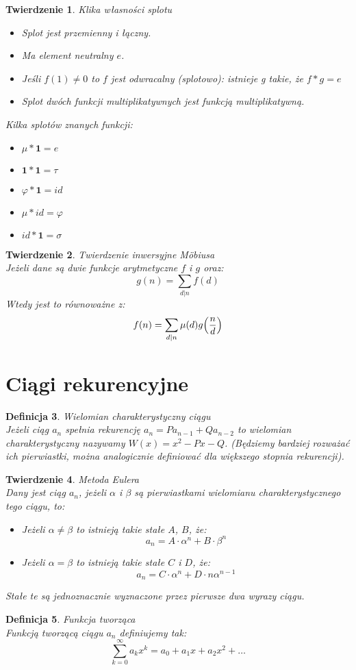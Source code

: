 \documentclass[10pt,a4paper]{article}
\newtheorem{theorem}{Twierdzenie}[section]
\newtheorem{defi}[theorem]{Definicja}
\newcommand{\q}{\textbf{1}}
\begin{document}
\begin{theorem}{Klika własności splotu}
	\color{black}
	\begin{itemize}
		\item Splot jest przemienny i łączny.
		\item Ma element neutralny $e$.
		\item Jeśli $f(1) \neq 0$ to $f$ jest odwracalny (splotowo): istnieje g takie, że $f*g=e$
		\item Splot dwóch funkcji multiplikatywnych jest funkcją multiplikatywną.
	\end{itemize}
	Kilka splotów znanych funkcji:
	\begin{itemize}
		\item $\mu * \q = e$
		\item $\q * \q = \tau$
		\item $\varphi * \q = id$
		\item $\mu * id = \varphi$
		\item $id * \q = \sigma$
	\end{itemize}
\end{theorem}
\begin{theorem}{Twierdzenie inwersyjne Möbiusa}
	\\ \color{black}
	Jeżeli dane są dwie funkcje arytmetyczne $f$ i $g$ oraz:
	$$g(n)=\sum_{d|n}f(d)$$
	Wtedy jest to równoważne z:
	$$f(n)=\sum_{d|n}\mu(d)g\Bigl(\frac{n}{d}\Bigr)$$
\end{theorem}
\section{Ciągi rekurencyjne}
\begin{defi}{Wielomian charakterystyczny ciągu}
	\\ 
	\color{black}
	Jeżeli ciąg $a_n$ spełnia rekurencję $a_n=Pa_{n-1}+Qa_{n-2}$ to wielomian charakterystyczny nazywamy $W(x)=x^2-Px-Q$. (Będziemy bardziej rozważać ich pierwiastki, można analogicznie definiować dla większego stopnia rekurencji).
\end{defi}
\begin{theorem}{Metoda Eulera}
	\\ 
	\color{black}
	Dany jest ciąg $a_n$, jeżeli $\alpha$ i $\beta$ są pierwiastkami wielomianu charakterystycznego tego ciągu, to: 
	\begin{itemize}
		\item Jeżeli $\alpha \neq \beta$ to istnieją takie stałe $A$, $B$, że: $$a_n=A\cdot \alpha^n+B\cdot \beta^n$$
		\item Jeżeli $\alpha=\beta$ to istnieją takie stałe $C$ i $D$, że:
		$$a_n=C\cdot \alpha^n+D\cdot n\alpha^{n-1}$$ 
	\end{itemize}
Stałe te są jednoznacznie wyznaczone przez pierwsze dwa wyrazy ciągu.
\end{theorem}
\begin{defi}{Funkcja tworząca}
	\\
	\color{black}
	Funkcją tworzącą ciągu $a_n$ definiujemy tak:
	$$\sum_{k=0}^{\infty} a_kx^k= a_0+a_1x+a_2x^2+\ldots$$
\end{defi}
\end{document}
